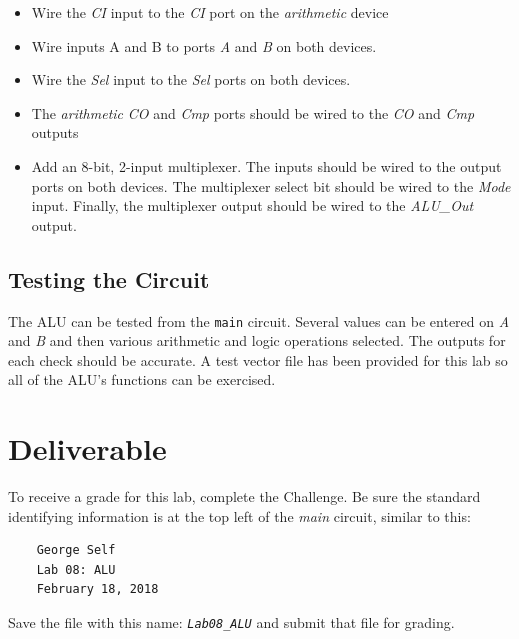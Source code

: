 \begin{itemize}
	\item Wire the \textit{CI} input to the \textit{CI} port on the \textit{arithmetic} device
	\item Wire inputs A and B to ports \textit{A} and \textit{B} on both devices.
	\item Wire the \textit{Sel} input to the \textit{Sel} ports on both devices.
	\item The \textit{arithmetic} \textit{CO} and \textit{Cmp} ports should be wired to the \textit{CO} and \textit{Cmp} outputs
	\item Add an 8-bit, 2-input multiplexer. The inputs should be wired to the output ports on both devices. The multiplexer select bit should be wired to the \textit{Mode} input. Finally, the multiplexer output should be wired to the \textit{ALU\_Out} output.
\end{itemize}


\subsection{Testing the Circuit}

The \ac{ALU} can be tested from the \lstinline[columns=fixed]|main| circuit. Several values can be entered on \textit{A} and \textit{B} and then various arithmetic and logic operations selected. The outputs for each check should be accurate. A test vector file has been provided for this lab so all of the ALU's functions can be exercised.

\section{Deliverable}

To receive a grade for this lab, complete the Challenge. Be sure the standard identifying information is at the top left of the \textit{main} circuit, similar to this: 

\bigskip
\begin{minipage}{\linewidth}
	\begin{verbatim}
	George Self
	Lab 08: ALU
	February 18, 2018
	\end{verbatim}
\end{minipage}
\bigskip

Save the file with this name: \emph{\texttt{Lab08\_ALU}} and submit that file for grading.

